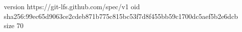 version https://git-lfs.github.com/spec/v1
oid sha256:99ec65d9063ce2cdeb871b775c815bc53f7d8f455bb59c1700dc5aef5b2e6dcb
size 70
